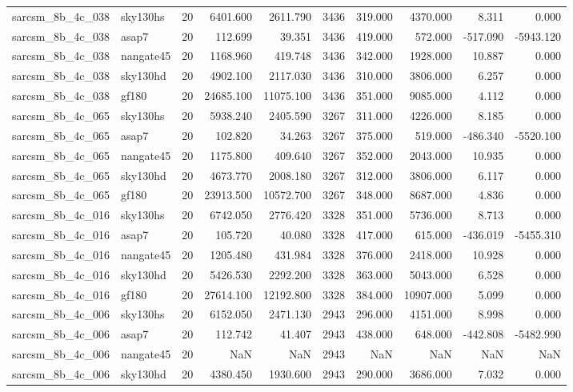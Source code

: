 \documentclass{article}
\begin{document}
\begin{longtable}{llrrrrrrrr}
sarcsm\_8b\_4c\_038 & sky130hs & 20 & 6401.600 & 2611.790 & 3436 & 319.000 & 4370.000 & 8.311 & 0.000 \\
sarcsm\_8b\_4c\_038 & asap7 & 20 & 112.699 & 39.351 & 3436 & 419.000 & 572.000 & -517.090 & -5943.120 \\
sarcsm\_8b\_4c\_038 & nangate45 & 20 & 1168.960 & 419.748 & 3436 & 342.000 & 1928.000 & 10.887 & 0.000 \\
sarcsm\_8b\_4c\_038 & sky130hd & 20 & 4902.100 & 2117.030 & 3436 & 310.000 & 3806.000 & 6.257 & 0.000 \\
sarcsm\_8b\_4c\_038 & gf180 & 20 & 24685.100 & 11075.100 & 3436 & 351.000 & 9085.000 & 4.112 & 0.000 \\
sarcsm\_8b\_4c\_065 & sky130hs & 20 & 5938.240 & 2405.590 & 3267 & 311.000 & 4226.000 & 8.185 & 0.000 \\
sarcsm\_8b\_4c\_065 & asap7 & 20 & 102.820 & 34.263 & 3267 & 375.000 & 519.000 & -486.340 & -5520.100 \\
sarcsm\_8b\_4c\_065 & nangate45 & 20 & 1175.800 & 409.640 & 3267 & 352.000 & 2043.000 & 10.935 & 0.000 \\
sarcsm\_8b\_4c\_065 & sky130hd & 20 & 4673.770 & 2008.180 & 3267 & 312.000 & 3806.000 & 6.117 & 0.000 \\
sarcsm\_8b\_4c\_065 & gf180 & 20 & 23913.500 & 10572.700 & 3267 & 348.000 & 8687.000 & 4.836 & 0.000 \\
sarcsm\_8b\_4c\_016 & sky130hs & 20 & 6742.050 & 2776.420 & 3328 & 351.000 & 5736.000 & 8.713 & 0.000 \\
sarcsm\_8b\_4c\_016 & asap7 & 20 & 105.720 & 40.080 & 3328 & 417.000 & 615.000 & -436.019 & -5455.310 \\
sarcsm\_8b\_4c\_016 & nangate45 & 20 & 1205.480 & 431.984 & 3328 & 376.000 & 2418.000 & 10.928 & 0.000 \\
sarcsm\_8b\_4c\_016 & sky130hd & 20 & 5426.530 & 2292.200 & 3328 & 363.000 & 5043.000 & 6.528 & 0.000 \\
sarcsm\_8b\_4c\_016 & gf180 & 20 & 27614.100 & 12192.800 & 3328 & 384.000 & 10907.000 & 5.099 & 0.000 \\
sarcsm\_8b\_4c\_006 & sky130hs & 20 & 6152.050 & 2471.130 & 2943 & 296.000 & 4151.000 & 8.998 & 0.000 \\
sarcsm\_8b\_4c\_006 & asap7 & 20 & 112.742 & 41.407 & 2943 & 438.000 & 648.000 & -442.808 & -5482.990 \\
sarcsm\_8b\_4c\_006 & nangate45 & 20 & NaN & NaN & 2943 & NaN & NaN & NaN & NaN \\
sarcsm\_8b\_4c\_006 & sky130hd & 20 & 4380.450 & 1930.600 & 2943 & 290.000 & 3686.000 & 7.032 & 0.000 \\

\end{longtable}
\end{document}
